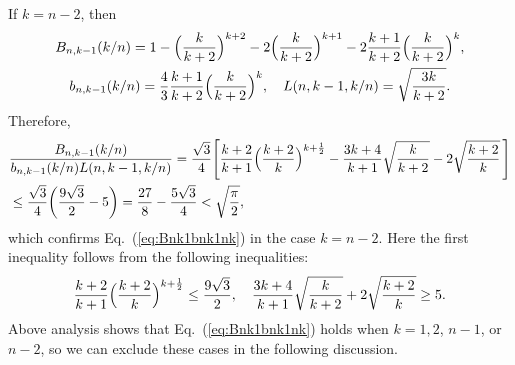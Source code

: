 \documentclass[aop]{imsart}
\theoremstyle{plain}
\theoremstyle{remark}
\newcommand{\1}{\operatorname{\uppercase\expandafter{\romannumeral1}}}
\newcommand{\2}{\operatorname{\uppercase\expandafter{\romannumeral2}}}
\newcommand{\3}{\operatorname{\uppercase\expandafter{\romannumeral3}}}
\newcommand{\4}{\operatorname{\uppercase\expandafter{\romannumeral4}}}
\newcommand{\5}{\operatorname{\uppercase\expandafter{\romannumeral5}}}
\newcommand{\6}{\operatorname{\uppercase\expandafter{\romannumeral6}}}
\newcommand{\7}{\operatorname{\uppercase\expandafter{\romannumeral7}}}
\newcommand{\8}{\operatorname{\uppercase\expandafter{\romannumeral8}}}
\newcommand{\9}{\operatorname{\uppercase\expandafter{\romannumeral9}}}
\newcommand{\eref}[1]{Eq.~\textup{(\ref{#1})}}
\begin{document}
\begin{appendix}
	If $k=n-2$, then 
	\begin{gather}
	B_{n,k-1}(k/n)=1-\Bigl(\frac{k}{k+2}\Bigr)^{k+2}-2\Bigl(\frac{k}{k+2}\Bigr)^{k+1}-2\frac{k+1}{k+2}\Bigl(\frac{k}{k+2}\Bigr)^k,\\ b_{n,k-1}(k/n)=\frac{4}{3}\frac{k+1}{k+2}\Bigl(\frac{k}{k+2}\Bigr)^k,\quad 
	L(n,k-1,k/n)=\sqrt{\frac{3k}{k+2}}.
	\end{gather}
	Therefore,
	\begin{align}
	&\frac{B_{n,k-1}(k/n)}{b_{n,k-1}(k/n)L(n,k-1,k/n)}=\frac{\sqrt{3}}{4}\Biggl[\frac{k+2}{k+1}\Bigl(\frac{k+2}{k}\Bigr)^{k+\frac{1}{2}}-\frac{3k+4}{k+1}\sqrt{\frac{k}{k+2}}-2\sqrt{\frac{k+2}{k}}\,\Biggr]\\
	&\leq \frac{\sqrt{3}}{4}\biggl(\frac{9\sqrt{3}}{2}-5\biggr)
	=\frac{27}{8}-\frac{5\sqrt{3}}{4}< \sqrt{\frac{\pi}{2}}, \nonumber
	\end{align}	
	which confirms \eref{eq:Bnk1bnk1nk} in the case $k=n-2$. Here
	the first inequality follows from the following inequalities:
	\begin{align}
	\frac{k+2}{k+1}\Bigl(\frac{k+2}{k}\Bigr)^{k+\frac{1}{2}}\leq \frac{9\sqrt{3}}{2},\quad \frac{3k+4}{k+1}\sqrt{\frac{k}{k+2}}+2\sqrt{\frac{k+2}{k}}\geq 5.
	\end{align}	
	Above analysis shows that \eref{eq:Bnk1bnk1nk} holds when 	$k=1,2 $, $n-1$, or $n-2$, so we can exclude these cases in the following discussion. \\
	

\end{appendix}
\end{document}
